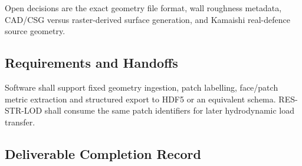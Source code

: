 Open decisions are the exact geometry file format, wall roughness
metadata, CAD/CSG versus raster-derived surface generation, and
Kamaishi real-defence source geometry.

\subsection{Requirements and Handoffs}
\label{sec:res-geo-rep-requirements}

Software shall support fixed geometry ingestion, patch labelling,
face/patch metric extraction and structured export to HDF5 or an
equivalent schema. RES-STR-LOD shall consume the same patch identifiers
for later hydrodynamic load transfer.

\subsection{Deliverable Completion Record}
\label{sec:res-geo-rep-completion-record}

%
%
%
